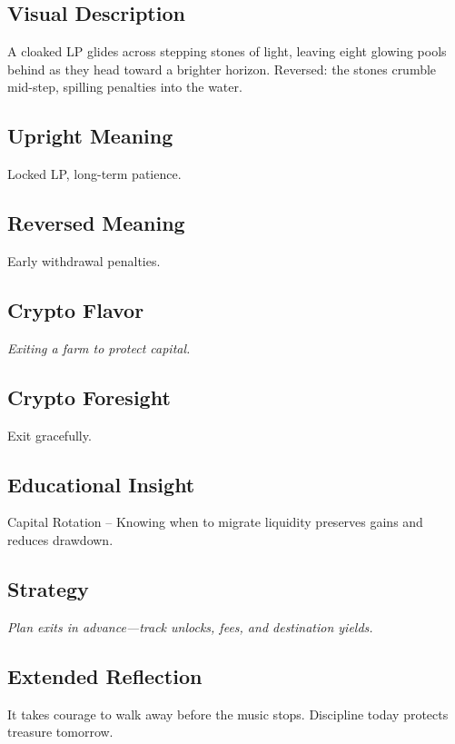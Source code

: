 \documentclass[11pt,oneside]{book}
\begin{document}
\begin{minipage}[t]{0.55\textwidth}
  \vspace{0pt}

  \subsection*{Visual Description}
  A cloaked LP glides across stepping stones of light, leaving eight glowing pools behind as they head toward a brighter horizon. Reversed: the stones crumble mid-step, spilling penalties into the water.

  \subsection*{Upright Meaning}
  Locked LP, long-term patience.

  \subsection*{Reversed Meaning}
  Early withdrawal penalties.

  \subsection*{Crypto Flavor}
  \textit{Exiting a farm to protect capital.}

  \subsection*{Crypto Foresight}
  Exit gracefully.

  \subsection*{Educational Insight}
  Capital Rotation – Knowing when to migrate liquidity preserves gains and reduces drawdown.

  \subsection*{Strategy}
  \textit{Plan exits in advance—track unlocks, fees, and destination yields.}

  \subsection*{Extended Reflection}
  It takes courage to walk away before the music stops. Discipline today protects treasure tomorrow.


\end{minipage}
\end{document}
